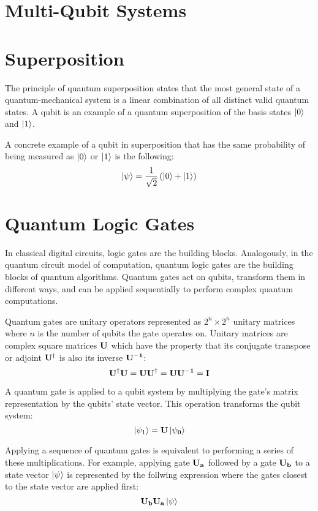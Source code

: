 \section{Multi-Qubit Systems}


\section{Superposition}

The principle of quantum superposition states that the most general state of a quantum-mechanical system is a linear combination of all distinct valid quantum states. A qubit is an example of a quantum superposition of the basis states $\left|{0}\right\rangle$ and $\left|{1}\right\rangle$.

A concrete example of a qubit in superposition that has the same probability of being measured as $\left|{0}\right\rangle$ or $\left|{1}\right\rangle$ is the following:
$$\left|{\psi}\right\rangle=\frac{1}{\sqrt{2}}\left(\left|{0}\right\rangle+\left|{1}\right\rangle\right)$$


\section{Quantum Logic Gates}

In classical digital circuits, logic gates are the building blocks. Analogously, in the quantum circuit model of computation, quantum logic gates are the building blocks of quantum algorithms. Quantum gates act on qubits, transform them in different ways, and can be applied sequentially to perform complex quantum computations.

Quantum gates are unitary operators represented as $2^n \times 2^n$ unitary matrices where $n$ is the number of qubits the gate operates on. Unitary matrices are complex square matrices $\bf{U}$ which have the property that its conjugate transpose or adjoint $\bf{U^{\dagger}}$ is also its inverse $\bf{U^{-1}}$:
$$\bf{U^{\dagger}U}=\bf{UU^{\dagger}}=\bf{UU^{-1}}=I$$

A quantum gate is applied to a qubit system by multiplying the gate's matrix representation by the qubits' state vector. This operation transforms the qubit system:
$$\left|{\psi_1}\right\rangle=\bf{U}\left|{\psi_0}\right\rangle$$

Applying a sequence of quantum gates is equivalent to performing a series of these multiplications. For example, applying gate $\bf{U_a}$ followed by a gate $\bf{U_b}$ to a state vector $\left|{\psi}\right\rangle$ is represented by the follwing expression where the gates closest to the state vector are applied first:
$$\bf{U_b}\bf{U_a}\left|{\psi}\right\rangle$$

